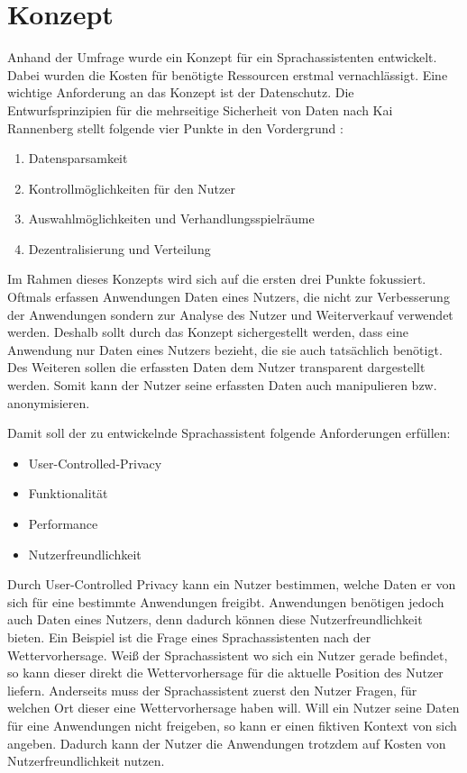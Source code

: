\section{Konzept}\label{sec:konzept}
Anhand der Umfrage wurde ein Konzept für ein Sprachassistenten entwickelt. Dabei wurden die Kosten für benötigte Ressourcen erstmal vernachlässigt. Eine wichtige Anforderung an das Konzept ist der Datenschutz. Die Entwurfsprinzipien für die mehrseitige Sicherheit von Daten nach Kai Rannenberg stellt folgende vier Punkte in den Vordergrund \cite{kairannenberg}:

\begin{enumerate}
	\item Datensparsamkeit
	\item Kontrollmöglichkeiten für den Nutzer 
	\item Auswahlmöglichkeiten und Verhandlungsspielräume 
	\item Dezentralisierung und Verteilung
\end{enumerate} 

Im Rahmen dieses Konzepts wird sich auf die ersten drei Punkte fokussiert. Oftmals erfassen Anwendungen Daten eines Nutzers, die nicht zur Verbesserung der Anwendungen sondern zur Analyse des Nutzer und Weiterverkauf verwendet werden. Deshalb sollt durch das Konzept sichergestellt werden, dass eine Anwendung nur Daten eines Nutzers bezieht, die sie auch tatsächlich benötigt. Des Weiteren sollen die erfassten Daten dem Nutzer transparent dargestellt werden. Somit kann der Nutzer seine erfassten Daten auch manipulieren bzw. anonymisieren. 

Damit soll der zu entwickelnde Sprachassistent folgende Anforderungen erfüllen:
\begin{itemize}
	\item User-Controlled-Privacy
	\item Funktionalität
	\item Performance
	\item Nutzerfreundlichkeit	
\end{itemize}

Durch User-Controlled Privacy kann ein Nutzer bestimmen, welche Daten er von sich für eine bestimmte Anwendungen freigibt. Anwendungen benötigen jedoch auch Daten eines Nutzers, denn dadurch können diese Nutzerfreundlichkeit bieten. Ein Beispiel ist die Frage eines Sprachassistenten nach der Wettervorhersage. Weiß der Sprachassistent wo sich ein Nutzer gerade befindet, so kann dieser direkt die Wettervorhersage für die aktuelle Position des Nutzer liefern. Anderseits muss der Sprachassistent zuerst den Nutzer Fragen, für welchen Ort dieser eine Wettervorhersage haben will. Will ein Nutzer seine Daten für eine Anwendungen nicht freigeben, so kann er einen fiktiven Kontext von sich angeben. Dadurch kann der Nutzer die Anwendungen trotzdem  auf Kosten von Nutzerfreundlichkeit nutzen.

